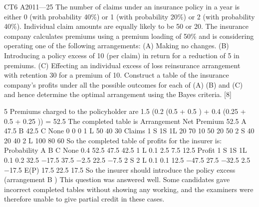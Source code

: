 CT6 A2011—25
The number of claims under an insurance policy in a year is either 0 (with probability
40\%) or 1 (with probability 20\%) or 2 (with probability 40\%). Individual claim
amounts are equally likely to be 50 or 20. The insurance company calculates
premiums using a premium loading of 50\% and is considering operating one of the
following arrangements:
(A) Making no changes.
(B) Introducing a policy excess of 10 (per claim) in return for a reduction of 5 in
premiums.
(C) Effecting an individual excess of loss reinsurance arrangement with retention
30 for a premium of 10.
Construct a table of the insurance company’s profits under all the possible outcomes
for each of (A) (B) and (C) and hence determine the optimal arrangement using the
Bayes criteria.
[8]



5
Premiums charged to the policyholder are
1.5 \times  (0.2 \times  (0.5  + 0.5 ) + 0.4 \times  (0.25  + 0.5  + 0.25 )) = 52.5
The completed table is
Arrangement Net Premium
52.5
A
47.5
B
42.5
C
None
0
0
0
1 L
50
40
30
Claims
1 S 1S 1L
20
70
10
50
20
50
2 S
40
20
40
2 L
100
80
60
So the completed table of profits for the insurer is:
Probability
A
B
C
None
0.4
52.5
47.5
42.5
1 L
0.1
2.5
7.5
12.5
Profit
1 S
1S 1L
0.1
0.2
32.5 −17.5
37.5 −2.5
22.5 −7.5
2 S
2 L
0.1
0.1
12.5 −47.5
27.5 −32.5
2.5 −17.5
E(P)
17.5
22.5
17.5
So the insurer should introduce the policy excess (arrangement B )
This question was answered well. Some candidates gave incorrect completed tables
without showing any working, and the examiners were therefore unable to give
partial credit in these cases.
